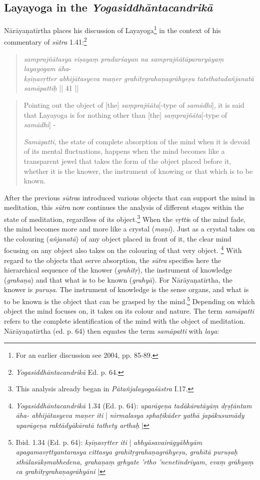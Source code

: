 \subsection{Layayoga in the \textit{Yogasiddhāntacandrikā}}

Nārāyaṇatīrtha places his discussion of Layayoga\footnote{For an earlier discussion see \citeauthor{penna2004} 2004, pp. 85-89.} in the context of his commentary of \textit{sūtra} 1.41:\footnote{\textit{Yogasiddhāntacandrikā} Ed. p. 64.} 

\begin{quote}
\textit{samprajñātasya viṣayaṃ pradarśayan na samprajñātāpararyāyaṃ layayogam āha}-\\
\textit{kṣīṇavṛtter abhijātasyeva maṇer grahītṛgrahaṇagrāhyeṣu tatsthatadañjanatā samāpattiḥ} || 41 ||
\end{quote}
\begin{quote}
Pointing out the object of [the] \textit{saṃprajñāta}[-type of \textit{samādhi}], it is said that Layayoga is for nothing other than [the] \textit{saṃprajñāta}[-type of \textit{samādhi}] - 

\textit{Samāpatti}, the state of complete absorption of the mind when it is devoid of its mental fluctuations, happens when the mind becomes like a transparent jewel that takes the form of the object placed before it, whether it is the knower, the instrument of knowing or that which is to be known.
\end{quote}

After the previous \textit{sūtra}s introduced various objects that can support the mind in meditation, this \textit{sūtra} now continues the analysis of different stages within the state of meditation, regardless of its object.\footnote{This analysis already began in \textit{Pātañjalayogaśāstra} I.17.} When the \textit{vṛtti}s of the mind fade, the mind becomes more and more like a crystal (\textit{maṇi}). Just as a crystal takes on the colouring (\textit{añjanatā}) of any object placed in front of it, the clear mind focusing on any object also takes on the colouring of that very object. \footnote{\textit{Yogasiddhāntacandrikā} 1.34 (Ed. p. 64): \textit{uparāgeṇa tadākāratāyāṃ dṛṣṭāntam āha- abhijātasyeva maṇer iti} | \textit{nirmalasya sphaṭikāder yathā japākusumādy uparāgeṇa raktādyākāratā tathety arthaḥ} |} With regard to the objects that serve absorption, the \textit{sūtra} specifies here the hierarchical sequence of the knower (\textit{grahītṛ}), the instrument of knowledge (\textit{grahaṇa}) and that what is to be known (\textit{grahyā}). For Nārāyaṇatīrtha, the knower is \textit{puruṣa}. The instrument of knowledge is the sense organs, and what is to be known is the object that can be grasped by the mind.\footnote{Ibid. 1.34 (Ed. p. 64): \textit{kṣīṇavṛtter iti} | \textit{abhyāsavairāgyābhyām apagamavṛttyantarasya cittasya grahītṛgrahaṇagrāhyeṣu, grahītā puruṣaḥ sthūlasūkṣmabhedena, grahaṇaṃ gṛhyate 'rtho 'nenetīndriyam, evaṃ grāhyaṃ ca grahītṛgrahaṇagrāhyāni} |} Depending on which object the mind focuses on, it takes on its colour and nature. The term \textit{samāpatti} refers to the complete identification of the mind with the object of meditation. Nārāyaṇatīrtha (ed. p. 64) then equates the term \textit{samāpatti} with \textit{laya}:

